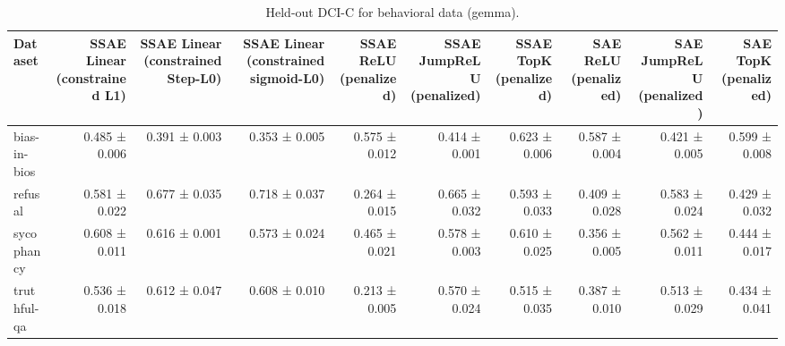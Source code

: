 \begin{table}[t]
\centering
\caption{Held-out DCI-C for behavioral data (gemma).}
\label{tab:behavioral-gemma-dci-c}
\begin{tabular}{lrrrrrrrrr}
\toprule
Dataset & SSAE Linear (constrained L1) & SSAE Linear (constrained Step-L0) & SSAE Linear (constrained sigmoid-L0) & SSAE ReLU (penalized) & SSAE JumpReLU (penalized) & SSAE TopK (penalized) & SAE ReLU (penalized) & SAE JumpReLU (penalized) & SAE TopK (penalized) \\
\midrule
bias-in-bios & 0.485 ± 0.006 & 0.391 ± 0.003 & 0.353 ± 0.005 & 0.575 ± 0.012 & 0.414 ± 0.001 & 0.623 ± 0.006 & 0.587 ± 0.004 & 0.421 ± 0.005 & 0.599 ± 0.008 \\
refusal & 0.581 ± 0.022 & 0.677 ± 0.035 & 0.718 ± 0.037 & 0.264 ± 0.015 & 0.665 ± 0.032 & 0.593 ± 0.033 & 0.409 ± 0.028 & 0.583 ± 0.024 & 0.429 ± 0.032 \\
sycophancy & 0.608 ± 0.011 & 0.616 ± 0.001 & 0.573 ± 0.024 & 0.465 ± 0.021 & 0.578 ± 0.003 & 0.610 ± 0.025 & 0.356 ± 0.005 & 0.562 ± 0.011 & 0.444 ± 0.017 \\
truthful-qa & 0.536 ± 0.018 & 0.612 ± 0.047 & 0.608 ± 0.010 & 0.213 ± 0.005 & 0.570 ± 0.024 & 0.515 ± 0.035 & 0.387 ± 0.010 & 0.513 ± 0.029 & 0.434 ± 0.041 \\
\bottomrule
\end{tabular}
\end{table}
